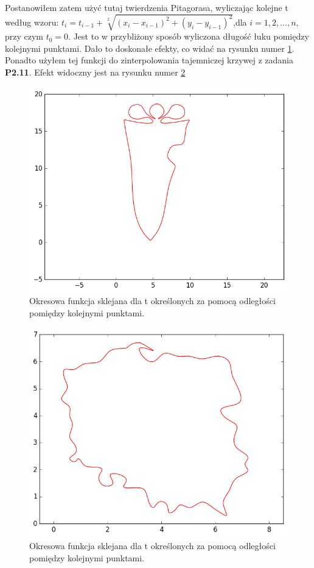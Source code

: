\documentclass{article}
\begin{document}
Postanowiłem zatem użyć tutaj twierdzenia Pitagorasa, wyliczając kolejne t według wzoru:
$t_i=t_{i-1}+\sqrt[2]{(x_i-x_{i-1})^2+(y_i-y_{i-1})^2}$,dla $i=1,2,\ldots,n$, przy czym $t_0=0$.
Jest to w przybliżony sposób wyliczona długość łuku pomiędzy kolejnymi punktami.
Dało to doskonałe efekty, co widać na rysunku numer \ref{p-o}. 
Ponadto użyłem tej funkcji do zinterpolowania tajemniczej krzywej z zadania \textbf{P2.11}. Efekt widoczny jest na rysunku numer \ref{polska}
\begin{figure}[H]
    \centering
	\includegraphics[width= 1 \textwidth]{okr-pit.png}
    \caption{Okresowa funkcja sklejana dla t określonych za pomocą odległości pomiędzy kolejnymi punktami. }
 	\label{p-o}
\end{figure}
\begin{figure}[H]
    \centering
	\includegraphics[width= 0.5 \textwidth]{polska.png}
    \caption{Okresowa funkcja sklejana dla t określonych za pomocą odległości pomiędzy kolejnymi punktami. }
 	\label{polska}
\end{figure}
\end{document}
